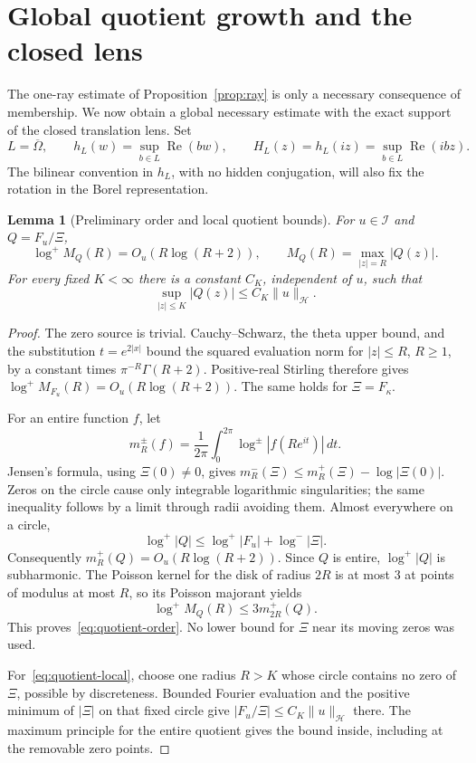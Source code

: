 \documentclass[11pt,a4paper]{article}
\numberwithin{equation}{section}
\newtheorem{lemma}[theorem]{Lemma}
\theoremstyle{definition}
\theoremstyle{remark}
\newcommand{\Hh}{\mathcal H}
\newcommand{\Ii}{\mathcal I}
\newcommand{\norm}[1]{\lVert #1\rVert}
\begin{document}
\section{Global quotient growth and the closed lens}\label{sec:global-growth}

The one-ray estimate of Proposition~\ref{prop:ray} is only a necessary consequence of membership. We now obtain a global necessary estimate with the exact support of the closed translation lens. Set
\begin{equation}\label{eq:closed-lens}
 L=\overline\Omega,\qquad
 h_L(w)=\sup_{b\in L}\operatorname{Re}(bw),\qquad
 H_L(z)=h_L(iz)=\sup_{b\in L}\operatorname{Re}(ibz).
\end{equation}
The bilinear convention in $h_L$, with no hidden conjugation, will also fix the rotation in the Borel representation.

\begin{lemma}[Preliminary order and local quotient bounds]\label{lem:quotient-order}
For $u\in\Ii$ and $Q=F_u/\Xi$,
\begin{equation}\label{eq:quotient-order}
 \log^+M_Q(R)=O_u(R\log(R+2)),
 \qquad M_Q(R)=\max_{|z|=R}|Q(z)|.
\end{equation}
For every fixed $K<\infty$ there is a constant $C_K$, independent of $u$, such that
\begin{equation}\label{eq:quotient-local}
 \sup_{|z|\le K}|Q(z)|\le C_K\norm{u}_{\Hh}.
\end{equation}
\end{lemma}
\begin{proof}
The zero source is trivial. Cauchy--Schwarz, the theta upper bound, and the substitution $t=e^{2|x|}$ bound the squared evaluation norm for $|z|\le R$, $R\ge1$, by a constant times $\pi^{-R}\Gamma(R+2)$. Positive-real Stirling therefore gives
$\log^+M_{F_u}(R)=O_u(R\log(R+2))$. The same holds for $\Xi=F_\kappa$.

For an entire function $f$, let
\[
 m_R^\pm(f)=\frac1{2\pi}\int_0^{2\pi}\log^\pm|f(Re^{it})|\,dt.
\]
Jensen's formula, using $\Xi(0)\ne0$, gives
$m_R^-(\Xi)\le m_R^+(\Xi)-\log|\Xi(0)|$. Zeros on the circle cause only integrable logarithmic singularities; the same inequality follows by a limit through radii avoiding them. Almost everywhere on a circle,
\[
 \log^+|Q|\le\log^+|F_u|+\log^-|\Xi|.
\]
Consequently $m_R^+(Q)=O_u(R\log(R+2))$. Since $Q$ is entire, $\log^+|Q|$ is subharmonic. The Poisson kernel for the disk of radius $2R$ is at most $3$ at points of modulus at most $R$, so its Poisson majorant yields
\[
 \log^+M_Q(R)\le3m_{2R}^+(Q).
\]
This proves~\eqref{eq:quotient-order}. No lower bound for $\Xi$ near its moving zeros was used.

For~\eqref{eq:quotient-local}, choose one radius $R>K$ whose circle contains no zero of $\Xi$, possible by discreteness. Bounded Fourier evaluation and the positive minimum of $|\Xi|$ on that fixed circle give
$|F_u/\Xi|\le C_K\norm{u}_{\Hh}$ there. The maximum principle for the entire quotient gives the bound inside, including at the removable zero points.
\end{proof}
\end{document}

